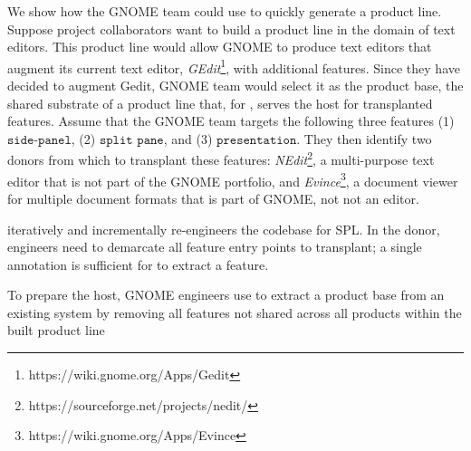 We show how the GNOME team could use \prodscalpel to quickly generate a product line. Suppose project collaborators want to build a product line in the domain of text editors. This product line would allow GNOME to produce text editors that augment its current text editor, \emph{GEdit}\footnote{https://wiki.gnome.org/Apps/Gedit}, with additional features. Since they have decided to augment Gedit, GNOME team would select it as the product base, the shared substrate of a product line that, for \FOUNDRY, serves the host for transplanted features.  Assume that the GNOME team targets the following three features (1) $\texttt{side-panel}$, (2) $\texttt{split pane}$, and (3) $\texttt{presentation}$. They then identify two donors from which to transplant these features:  \emph{NEdit}\footnote{https://sourceforge.net/projects/nedit/}, a multi-purpose text editor that is not part of the GNOME portfolio, and \emph{Evince}\footnote{https://wiki.gnome.org/Apps/Evince}, a document viewer for multiple document formats that is part of GNOME, not not an editor. 
 
\prodscalpel iteratively and incrementally re-engineers the codebase for SPL.  In the donor, engineers need to demarcate all feature entry points to transplant; a single annotation is sufficient for \prodscalpel to extract a feature. 

To prepare the host, GNOME engineers use \prodscalpel to extract a product base from an existing system by removing all features not shared across all products within the built product line
 
